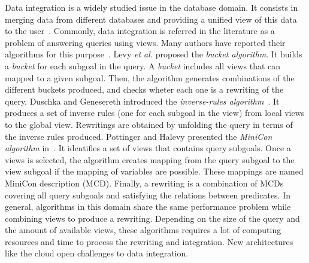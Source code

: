 \documentclass[11pt,a4paper,oneside]{report}
\begin{document}
Data integration is a widely studied issue in the database domain. It consists in merging data from different databases and providing a unified view of this data to the user~\cite{Lenzerini:2002}. Commonly, data integration is referred in the literature as a problem of answering queries using views. Many authors have reported their algorithms for this purpose~\cite{Halevy:2001}. Levy \textit{et al.} proposed the \textit{bucket algorithm}. It builds a \textit{bucket} for each subgoal in the query. A \textit{bucket} includes all views that can mapped to a given subgoal. Then, the algorithm generates combinations of the different buckets produced, and checks wheter each one is a rewriting of the query. Duschka and Genesereth introduced the \textit{inverse-rules algorithm}~\cite{Duschka:1997}. It produces a set of inverse rules (one for each subgoal in the view) from local views to the global view. Rewritings are obtained by unfolding the query in terms of the inverse rules produced. Pottinger and Halevy presented the \textit{MiniCon algorithm} in~\cite{Pottinger:2001}. It identifies a set of views that contains query subgoals. Once a views is selected, the algorithm creates mapping from the query subgoal to the view subgoal if the mapping of variables are possible. These mappings are named MiniCon description (MCD). Finally, a rewriting is a combination of MCDs covering all query subgoals and satisfying the relations between predicates. In general, algorithms in this domain share the same performance problem while combining views to produce a rewriting. Depending on the size of the query and the amount of available views, these algorithms requires a lot of computing resources and time to process the rewriting and integration. New architectures like the cloud open challenges to data integration.
\end{document}
